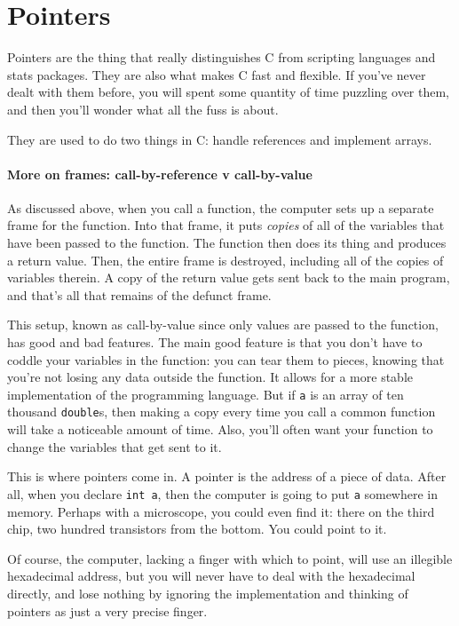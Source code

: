 \documentclass[12pt]{article}
\def\ind#1{\index{#1}#1}
\begin{document}
 \label{prepointers}\section{Pointers} \label{pointers} 

Pointers are the thing that really distinguishes C from scripting
languages and stats packages. They are also what makes C fast and
flexible. If you've never dealt with them before, you will spent some
quantity of time puzzling over them, and then you'll wonder what all the
fuss is about. 

They are used to do two things in C: handle references and implement arrays.

\paragraph{More on \ind{frames}: \ind{call-by-reference} v \ind{call-by-value}}

As discussed above,
when you call a function, the computer sets up a separate frame
for the function. Into that frame, it puts {\it copies} of all of the
variables that have been passed to the function. The function then does its
thing and produces a return value. Then, the entire frame is destroyed,
including all of the copies of variables therein. A copy of the return value gets
sent back to the main program, and that's all that remains of the defunct
frame. 

This setup, known as call-by-value since only values are passed to the
function, has good and bad features. The main good feature is that you
don't have to coddle your variables in the function: you can tear them to
pieces, knowing that you're not losing any data outside the function. It
allows for a more stable implementation of the programming language. But if {\tt a}
is an array of ten thousand {\tt double}s, then making a copy every time
you call a common function will take a noticeable amount of time. Also,
you'll often want your function to change the variables that get
sent to it.

This is where pointers come in. A pointer is the address of a piece of
data. After all, when you declare {\tt int a}, then the computer is
going to put {\tt a} somewhere in memory. Perhaps with a microscope,
you could even find it: there on the third chip, two hundred transistors
from the bottom. You could point to it.

Of course, the computer, lacking a finger with which to point, will use
an illegible hexadecimal address, but you will never have to deal with
the hexadecimal directly, and lose nothing by ignoring the implementation
and thinking of pointers as just a very precise finger.
\end{document}
